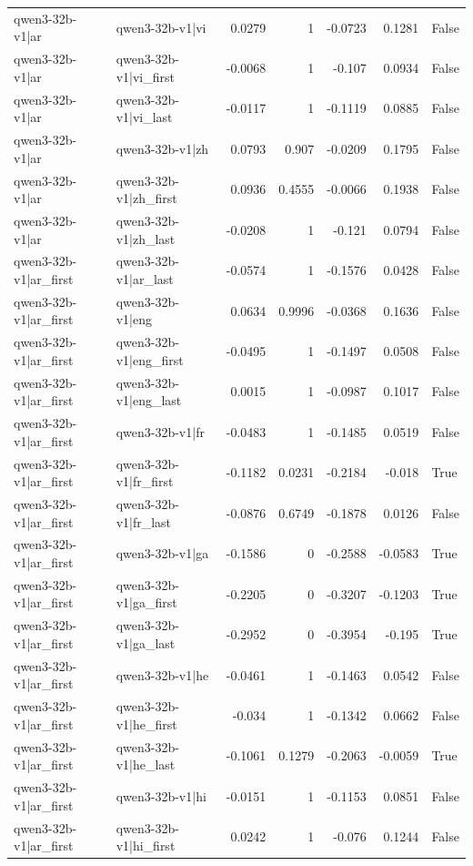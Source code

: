 \begin{table}
\begin{tabular}{l l r r r r l}
qwen3-32b-v1|ar & qwen3-32b-v1|vi & 0.0279 & 1 & -0.0723 & 0.1281 & False \\
qwen3-32b-v1|ar & qwen3-32b-v1|vi_first & -0.0068 & 1 & -0.107 & 0.0934 & False \\
qwen3-32b-v1|ar & qwen3-32b-v1|vi_last & -0.0117 & 1 & -0.1119 & 0.0885 & False \\
qwen3-32b-v1|ar & qwen3-32b-v1|zh & 0.0793 & 0.907 & -0.0209 & 0.1795 & False \\
qwen3-32b-v1|ar & qwen3-32b-v1|zh_first & 0.0936 & 0.4555 & -0.0066 & 0.1938 & False \\
qwen3-32b-v1|ar & qwen3-32b-v1|zh_last & -0.0208 & 1 & -0.121 & 0.0794 & False \\
qwen3-32b-v1|ar_first & qwen3-32b-v1|ar_last & -0.0574 & 1 & -0.1576 & 0.0428 & False \\
qwen3-32b-v1|ar_first & qwen3-32b-v1|eng & 0.0634 & 0.9996 & -0.0368 & 0.1636 & False \\
qwen3-32b-v1|ar_first & qwen3-32b-v1|eng_first & -0.0495 & 1 & -0.1497 & 0.0508 & False \\
qwen3-32b-v1|ar_first & qwen3-32b-v1|eng_last & 0.0015 & 1 & -0.0987 & 0.1017 & False \\
qwen3-32b-v1|ar_first & qwen3-32b-v1|fr & -0.0483 & 1 & -0.1485 & 0.0519 & False \\
qwen3-32b-v1|ar_first & qwen3-32b-v1|fr_first & -0.1182 & 0.0231 & -0.2184 & -0.018 & True \\
qwen3-32b-v1|ar_first & qwen3-32b-v1|fr_last & -0.0876 & 0.6749 & -0.1878 & 0.0126 & False \\
qwen3-32b-v1|ar_first & qwen3-32b-v1|ga & -0.1586 & 0 & -0.2588 & -0.0583 & True \\
qwen3-32b-v1|ar_first & qwen3-32b-v1|ga_first & -0.2205 & 0 & -0.3207 & -0.1203 & True \\
qwen3-32b-v1|ar_first & qwen3-32b-v1|ga_last & -0.2952 & 0 & -0.3954 & -0.195 & True \\
qwen3-32b-v1|ar_first & qwen3-32b-v1|he & -0.0461 & 1 & -0.1463 & 0.0542 & False \\
qwen3-32b-v1|ar_first & qwen3-32b-v1|he_first & -0.034 & 1 & -0.1342 & 0.0662 & False \\
qwen3-32b-v1|ar_first & qwen3-32b-v1|he_last & -0.1061 & 0.1279 & -0.2063 & -0.0059 & True \\
qwen3-32b-v1|ar_first & qwen3-32b-v1|hi & -0.0151 & 1 & -0.1153 & 0.0851 & False \\
qwen3-32b-v1|ar_first & qwen3-32b-v1|hi_first & 0.0242 & 1 & -0.076 & 0.1244 & False \\

\end{tabular}
\end{table}
